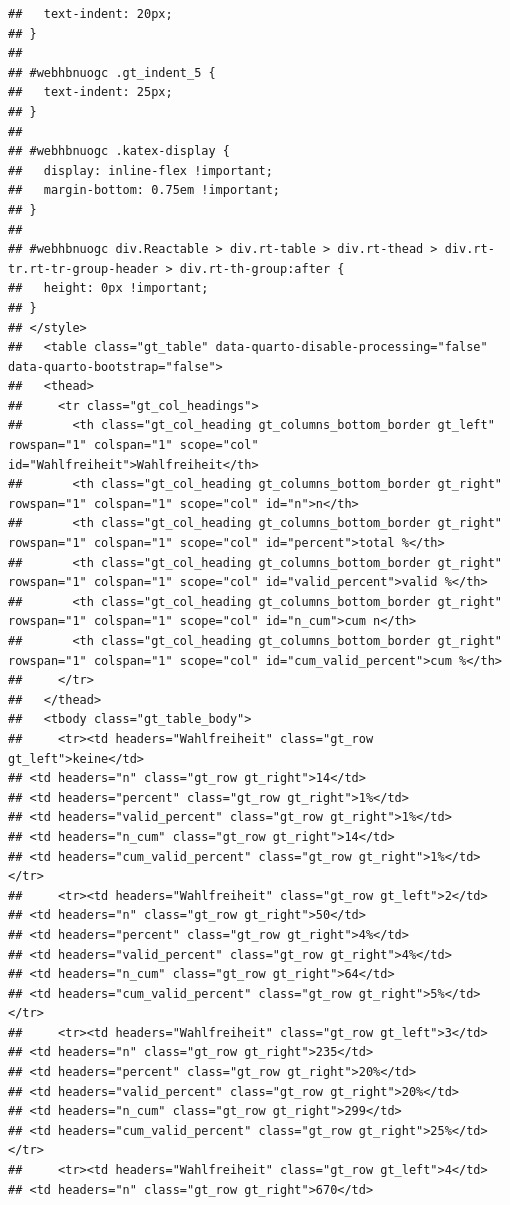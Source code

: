 \documentclass[
  a4paper,
  DIV=11,
  numbers=noendperiod]{scrartcl}
\begin{document}
\begin{verbatim}
##   text-indent: 20px;
## }
## 
## #webhbnuogc .gt_indent_5 {
##   text-indent: 25px;
## }
## 
## #webhbnuogc .katex-display {
##   display: inline-flex !important;
##   margin-bottom: 0.75em !important;
## }
## 
## #webhbnuogc div.Reactable > div.rt-table > div.rt-thead > div.rt-tr.rt-tr-group-header > div.rt-th-group:after {
##   height: 0px !important;
## }
## </style>
##   <table class="gt_table" data-quarto-disable-processing="false" data-quarto-bootstrap="false">
##   <thead>
##     <tr class="gt_col_headings">
##       <th class="gt_col_heading gt_columns_bottom_border gt_left" rowspan="1" colspan="1" scope="col" id="Wahlfreiheit">Wahlfreiheit</th>
##       <th class="gt_col_heading gt_columns_bottom_border gt_right" rowspan="1" colspan="1" scope="col" id="n">n</th>
##       <th class="gt_col_heading gt_columns_bottom_border gt_right" rowspan="1" colspan="1" scope="col" id="percent">total %</th>
##       <th class="gt_col_heading gt_columns_bottom_border gt_right" rowspan="1" colspan="1" scope="col" id="valid_percent">valid %</th>
##       <th class="gt_col_heading gt_columns_bottom_border gt_right" rowspan="1" colspan="1" scope="col" id="n_cum">cum n</th>
##       <th class="gt_col_heading gt_columns_bottom_border gt_right" rowspan="1" colspan="1" scope="col" id="cum_valid_percent">cum %</th>
##     </tr>
##   </thead>
##   <tbody class="gt_table_body">
##     <tr><td headers="Wahlfreiheit" class="gt_row gt_left">keine</td>
## <td headers="n" class="gt_row gt_right">14</td>
## <td headers="percent" class="gt_row gt_right">1%</td>
## <td headers="valid_percent" class="gt_row gt_right">1%</td>
## <td headers="n_cum" class="gt_row gt_right">14</td>
## <td headers="cum_valid_percent" class="gt_row gt_right">1%</td></tr>
##     <tr><td headers="Wahlfreiheit" class="gt_row gt_left">2</td>
## <td headers="n" class="gt_row gt_right">50</td>
## <td headers="percent" class="gt_row gt_right">4%</td>
## <td headers="valid_percent" class="gt_row gt_right">4%</td>
## <td headers="n_cum" class="gt_row gt_right">64</td>
## <td headers="cum_valid_percent" class="gt_row gt_right">5%</td></tr>
##     <tr><td headers="Wahlfreiheit" class="gt_row gt_left">3</td>
## <td headers="n" class="gt_row gt_right">235</td>
## <td headers="percent" class="gt_row gt_right">20%</td>
## <td headers="valid_percent" class="gt_row gt_right">20%</td>
## <td headers="n_cum" class="gt_row gt_right">299</td>
## <td headers="cum_valid_percent" class="gt_row gt_right">25%</td></tr>
##     <tr><td headers="Wahlfreiheit" class="gt_row gt_left">4</td>
## <td headers="n" class="gt_row gt_right">670</td>

\end{verbatim}
\end{document}
